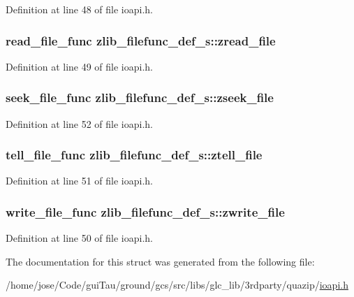 Definition at line 48 of file ioapi.\-h.

\hypertarget{structzlib__filefunc__def__s_ab14f748de7516525e5d2b78c47aca92e}{
\subsubsection[{zread\-\_\-file}]{\setlength{\rightskip}{0pt plus 5cm}read\-\_\-file\-\_\-func zlib\-\_\-filefunc\-\_\-def\-\_\-s\-::zread\-\_\-file}}\label{structzlib__filefunc__def__s_ab14f748de7516525e5d2b78c47aca92e}


Definition at line 49 of file ioapi.\-h.

\hypertarget{structzlib__filefunc__def__s_a4747bdf97a3f44fe4b958114c11e1dcf}{
\subsubsection[{zseek\-\_\-file}]{\setlength{\rightskip}{0pt plus 5cm}seek\-\_\-file\-\_\-func zlib\-\_\-filefunc\-\_\-def\-\_\-s\-::zseek\-\_\-file}}\label{structzlib__filefunc__def__s_a4747bdf97a3f44fe4b958114c11e1dcf}


Definition at line 52 of file ioapi.\-h.

\hypertarget{structzlib__filefunc__def__s_ac8b933601443cdd83f8cc02004c77d0d}{
\subsubsection[{ztell\-\_\-file}]{\setlength{\rightskip}{0pt plus 5cm}tell\-\_\-file\-\_\-func zlib\-\_\-filefunc\-\_\-def\-\_\-s\-::ztell\-\_\-file}}\label{structzlib__filefunc__def__s_ac8b933601443cdd83f8cc02004c77d0d}


Definition at line 51 of file ioapi.\-h.

\hypertarget{structzlib__filefunc__def__s_a710b490fec793486ef5bedd9f2e1136d}{
\subsubsection[{zwrite\-\_\-file}]{\setlength{\rightskip}{0pt plus 5cm}write\-\_\-file\-\_\-func zlib\-\_\-filefunc\-\_\-def\-\_\-s\-::zwrite\-\_\-file}}\label{structzlib__filefunc__def__s_a710b490fec793486ef5bedd9f2e1136d}


Definition at line 50 of file ioapi.\-h.



The documentation for this struct was generated from the following file\-:\begin{DoxyCompactItemize}
\item 
/home/jose/\-Code/gui\-Tau/ground/gcs/src/libs/glc\-\_\-lib/3rdparty/quazip/\hyperlink{ioapi_8h}{ioapi.\-h}\end{DoxyCompactItemize}
